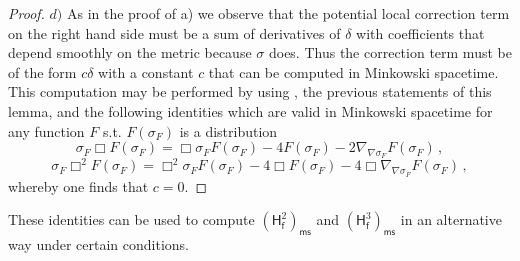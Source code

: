 \documentclass[11pt]{book}
\newcommand{\ms}{\mathsf{ms}}
\newcommand{\Hsf}{\mathsf{H}}
\newcommand{\fsf}{\mathsf{f}}
\theoremstyle{break}
\begin{document}
\begin{proof}
$d)$ As in the proof of a) we observe that the potential local correction term on the right hand side must be a sum of derivatives of $\delta$ with coefficients that depend smoothly on the metric because $\sigma$ does. Thus the correction term must be of the form $c\delta$ with a constant $c$ that can be computed in Minkowski spacetime. This computation may be performed by using %
, the previous statements of this lemma, and the following identities which are valid in Minkowski spacetime for any function $F$ s.t. $F(\sigma_F)$ is a distribution
$$\sigma_F\Box  F(\sigma_F)=\Box \sigma_F F(\sigma_F) - 4 F(\sigma_F) - 2\nabla_{\nabla\sigma_F}F(\sigma_F)\,,$$
$$\sigma_F\Box^2  F(\sigma_F)=\Box^2 \sigma_F F(\sigma_F) - 4 \Box F(\sigma_F) - 4\Box \nabla_{\nabla\sigma_F}F(\sigma_F)\,,$$
whereby one finds that $c=0$.





\end{proof}



These identities can be used to compute $\left(\Hsf_\fsf^2\right)_\ms$ and $\left(\Hsf_\fsf^3\right)_\ms$ in an alternative way under certain conditions.
\end{document}
